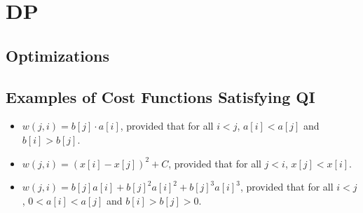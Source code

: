 \chapter{DP}

\section{Optimizations}

\section*{Examples of Cost Functions Satisfying QI}

\begin{itemize}
\item $w(j,i)=b[j]\cdot a[i]$, provided that for all $i<j$, $a[i]<a[j]$ and $b[i]>b[j]$.
\item $w(j,i)=(x[i]-x[j])^2 + C$, provided that for all $j<i$, $x[j]<x[i]$.
\item $w(j,i)=b[j]a[i] + b[j]^2 a[i]^2 + b[j]^3 a[i]^3$, provided that for all $i<j$, $0<a[i]<a[j]$ and $b[i]>b[j]>0$.
\end{itemize}
